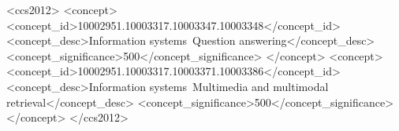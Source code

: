\documentclass[sigconf]{acmart}
\newcommand{\lyc}[1]{{\color{black}{#1}}}
\begin{document}
\begin{CCSXML}
<ccs2012>
   <concept>
       <concept_id>10002951.10003317.10003347.10003348</concept_id>
       <concept_desc>Information systems~Question answering</concept_desc>
       <concept_significance>500</concept_significance>
       </concept>
   <concept>
       <concept_id>10002951.10003317.10003371.10003386</concept_id>
       <concept_desc>Information systems~Multimedia and multimodal retrieval</concept_desc>
       <concept_significance>500</concept_significance>
       </concept>
 </ccs2012>
\end{CCSXML}


\keywords{\lyc{Video Question Answering, Invariant Learning, Equivariant Learning, Interpretability}}

\maketitle
\begin{sloppypar}








% 



\balance




\end{sloppypar}
\end{document}
